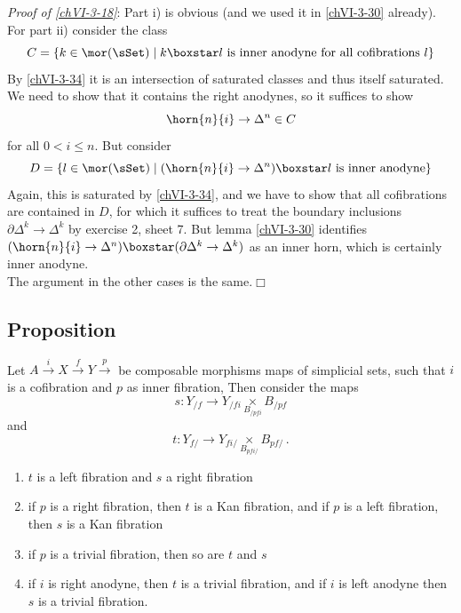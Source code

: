         \emph{Proof of \ref{chVI-3-18}}: Part i) is obvious (and we used it in \ref{chVI-3-30} already). For part ii) consider the class
        \begin{equation*}
            C = \{ k \in \mor (\sSet) \mid k \boxstar l \text{ is inner anodyne for all cofibrations } l\}
        \end{equation*}	
        By \ref{chVI-3-34} it is an intersection of saturated classes and thus itself saturated. We need to show that it contains the right anodynes, so it suffices to show
        \begin{equation*}
            \horn{n}{i} \to \Delta^n \in C
        \end{equation*}
        for all $0 < i \leq n$. But consider
        \begin{equation*}
            D = \{ l \in \mor (\sSet) \mid (\horn{n}{i} \to \Delta^n) \boxstar l \text{ is inner anodyne}\}
        \end{equation*}
        Again, this is saturated by \ref{chVI-3-34}, and we have to show that all cofibrations are contained in $D$, for which it suffices to treat the boundary inclusions $\partial \Delta^k \to \Delta^k$ by exercise 2, sheet 7. But lemma \ref{chVI-3-30} identifies $(\horn{n}{i} \to \Delta^n) \boxstar (\partial \Delta^k \to \Delta^k)$ as an inner horn, which is certainly inner anodyne.\\
        The argument in the other cases is the same.\hfill$\Box$

    \subsection{Proposition}\label{chVI-3-43}
        Let $A \xrightarrow{i} X \xrightarrow{f} Y \xrightarrow{p}$ be composable morphisms maps of simplicial sets, such that $i$ is a cofibration and $p$ as inner fibration, Then consider the maps
        \begin{equation*}
            s \colon Y_{/ f} \to Y_{/ f i} \underset{B_{/ p f i}}{\times} B_{/ p f}
        \end{equation*}
        and
        \begin{equation*}
            t \colon Y_{f /} \to Y_{f i /} \underset{B_{p f i /}}{\times} B_{p f /} \,. 
        \end{equation*}
        \begin{enumerate}[label=\roman*)]
            \item 
                $t$ is a left fibration and $s$ a right fibration
            \item 
                if $p$ is a right fibration, then $t$ is a Kan fibration, and if $p$ is a left fibration, then $s$ is a Kan fibration
            \item 
                if $p$ is a trivial fibration, then so are $t$ and $s$
            \item 
                if $i$ is right anodyne, then $t$ is a trivial fibration, and if $i$ is left anodyne then $s$ is a trivial fibration.
        \end{enumerate}

